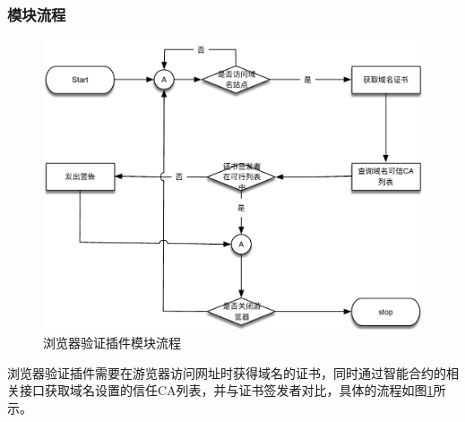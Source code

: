 \subsubsection{模块流程}

\begin{figure}[!htbp]
 	\centering
 	\includegraphics[width=1\textwidth]{img/chrome_extension}
 	\caption{浏览器验证插件模块流程}\label{fig:chrome_extension}
\end{figure}

浏览器验证插件需要在游览器访问网址时获得域名的证书，同时通过智能合约的相关接口获取域名设置的信任CA列表，并与证书签发者对比，具体的流程如图\ref{fig:chrome_extension}所示。







	





